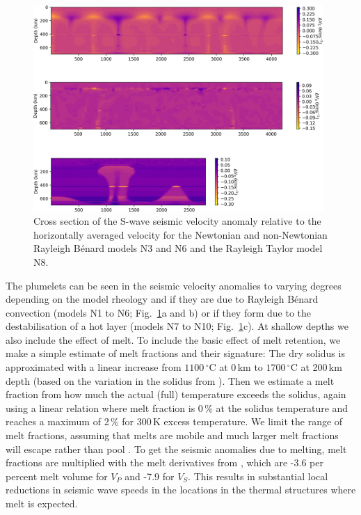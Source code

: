 \documentclass[a4paper,10pt,twocolumn]{paper}
\begin{document}
\begin{figure}
\centering
\includegraphics[width=11cm]{../figures-working/velocities.png}
\caption{Cross section of the S-wave seismic velocity anomaly relative to the horizontally averaged velocity for the Newtonian and non-Newtonian Rayleigh B{\'e}nard models N3 and N6 and the Rayleigh Taylor model N8.}
\label{fg:5b}
\end{figure}

The plumelets can be seen in the seismic velocity anomalies to varying degrees depending on the model rheology and if they are due to Rayleigh B{\'e}nard convection (models N1 to N6; Fig.~\ref{fg:5b}a and b) or if  they form due to the destabilisation of a hot layer (models N7 to N10; Fig.~\ref{fg:5b}c). At shallow depths we also include the effect of melt. To include the basic effect of melt retention, we make a simple estimate of melt fractions and their signature: The dry solidus is approximated with a linear increase from $1100\,^{\circ}$C at 0\,km to $1700\,^{\circ}$C at 200\,km depth (based on the variation in the solidus from \citealp{herzberg-etal-2000}). Then we estimate a melt fraction from how much the actual (full) temperature exceeds the solidus, again using a linear relation where melt fraction is 0\,\% at the solidus temperature and reaches a maximum of 2\,\% for 300\,K excess temperature. We limit the range of melt fractions, assuming that melts are mobile and much larger melt fractions will escape rather than pool \citep[e.g.][]{faul-etal-1994}. To get the seismic anomalies due to melting, melt fractions are multiplied with the melt derivatives from \cite{hammond-2000}, which are -3.6 per percent melt volume for $V_{P}$ and -7.9 for $V_{S}$. This results in substantial local reductions in seismic wave speeds in the locations in the thermal structures where melt is expected.
\end{document}
